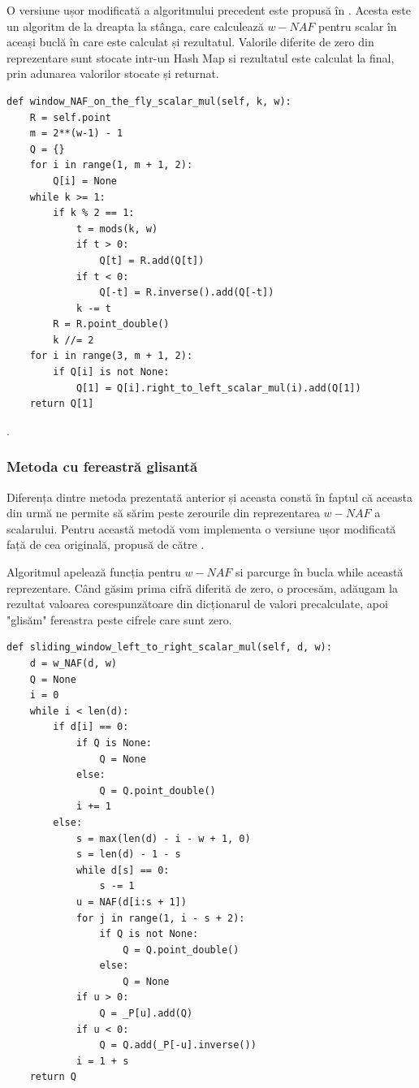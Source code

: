 O versiune ușor modificată a algoritmului precedent este propusă în \cite{sliding2}. Acesta este un algoritm de la dreapta la stânga, care calculează $w-NAF$ pentru scalar în aceași buclă în care este calculat și rezultatul. Valorile diferite de zero din reprezentare sunt stocate intr-un Hash Map si rezultatul este calculat la final, prin adunarea valorilor stocate și returnat.

\begin{lstlisting}
def window_NAF_on_the_fly_scalar_mul(self, k, w):
    R = self.point
    m = 2**(w-1) - 1
    Q = {}
    for i in range(1, m + 1, 2):
        Q[i] = None
    while k >= 1:
        if k % 2 == 1:
            t = mods(k, w)
            if t > 0:
                Q[t] = R.add(Q[t])
            if t < 0:
                Q[-t] = R.inverse().add(Q[-t])
            k -= t
        R = R.point_double()
        k //= 2
    for i in range(3, m + 1, 2):
        if Q[i] is not None:
            Q[1] = Q[i].right_to_left_scalar_mul(i).add(Q[1])
    return Q[1]
\end{lstlisting}.

\subsubsection{Metoda cu fereastră glisantă}

Diferența dintre metoda prezentată anterior și aceasta constă în faptul că aceasta din urmă ne permite să sărim peste zerourile din reprezentarea $w-NAF$ a scalarului. Pentru această metodă vom implementa o versiune ușor modificată față de cea originală, propusă de către \cite{sliding}.

Algoritmul apelează funcția pentru $w-NAF$ si parcurge în bucla while această reprezentare. Când găsim prima cifră diferită de zero, o procesăm, adăugam la rezultat valoarea corespunzătoare din dicționarul de valori precalculate, apoi "glisăm" fereastra peste cifrele care sunt zero.

\begin{lstlisting}
def sliding_window_left_to_right_scalar_mul(self, d, w):
    d = w_NAF(d, w)
    Q = None
    i = 0
    while i < len(d):
        if d[i] == 0:
            if Q is None:
                Q = None
            else:
                Q = Q.point_double()
            i += 1
        else:
            s = max(len(d) - i - w + 1, 0)
            s = len(d) - 1 - s
            while d[s] == 0:
                s -= 1
            u = NAF(d[i:s + 1])
            for j in range(1, i - s + 2):
                if Q is not None:
                    Q = Q.point_double()
                else:
                    Q = None
            if u > 0:
                Q = _P[u].add(Q)
            if u < 0:
                Q = Q.add(_P[-u].inverse())
            i = 1 + s
    return Q
\end{lstlisting}

